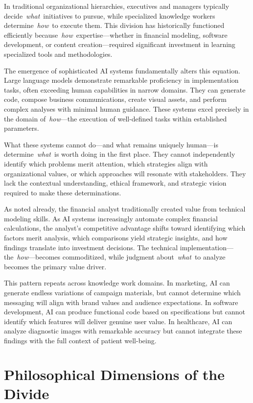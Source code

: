\documentclass[
  Letterpaper,
]{scrbook}
\begin{document}
In traditional organizational hierarchies, executives and managers
typically decide~\emph{what}~initiatives to pursue, while specialized
knowledge workers determine~\emph{how}~to execute them. This division
has historically functioned efficiently
because~\emph{how}~expertise---whether in financial modeling, software
development, or content creation---required significant investment in
learning specialized tools and methodologies.

The emergence of sophisticated AI systems fundamentally alters this
equation. Large language models demonstrate remarkable proficiency in
implementation tasks, often exceeding human capabilities in narrow
domains. They can generate code, compose business communications, create
visual assets, and perform complex analyses with minimal human guidance.
These systems excel precisely in the domain of~\emph{how}---the
execution of well-defined tasks within established parameters.

What these systems cannot do---and what remains uniquely human---is
determine~\emph{what}~is worth doing in the first place. They cannot
independently identify which problems merit attention, which strategies
align with organizational values, or which approaches will resonate with
stakeholders. They lack the contextual understanding, ethical framework,
and strategic vision required to make these determinations.

As noted already, the financial analyst traditionally created value from
technical modeling skills. As AI systems increasingly automate complex
financial calculations, the analyst's competitive advantage shifts
toward identifying which factors merit analysis, which comparisons yield
strategic insights, and how findings translate into investment
decisions. The technical implementation---the~\emph{how}---becomes
commoditized, while judgment about~\emph{what}~to analyze becomes the
primary value driver.

This pattern repeats across knowledge work domains. In marketing, AI can
generate endless variations of campaign materials, but cannot determine
which messaging will align with brand values and audience expectations.
In software development, AI can produce functional code based on
specifications but cannot identify which features will deliver genuine
user value. In healthcare, AI can analyze diagnostic images with
remarkable accuracy but cannot integrate these findings with the full
context of patient well-being.

\section{Philosophical Dimensions of the
Divide}\label{philosophical-dimensions-of-the-divide}
\end{document}

